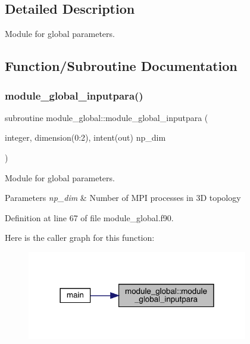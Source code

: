 \subsection{Detailed Description}
Module for global parameters. 

\subsection{Function/\+Subroutine Documentation}
\mbox{\label{namespacemodule__global_a74cb46a87131e7b91b464cd2a2c480d2}} 
\subsubsection{\texorpdfstring{module\_global\_inputpara()}{module\_global\_inputpara()}}
{\footnotesize\ttfamily subroutine module\+\_\+global\+::module\+\_\+global\+\_\+inputpara (\begin{DoxyParamCaption}\item[{integer, dimension(0\+:2), intent(out)}]{np\+\_\+dim }\end{DoxyParamCaption})}



Module for global parameters. 


\begin{DoxyParams}{Parameters}
{\em np\+\_\+dim} & Number of M\+PI processes in 3D topology \\
\hline
\end{DoxyParams}


Definition at line 67 of file module\+\_\+global.\+f90.

Here is the caller graph for this function\+:\nopagebreak
\begin{figure}[H]
\begin{center}
\leavevmode
\includegraphics[width=273pt]{namespacemodule__global_a74cb46a87131e7b91b464cd2a2c480d2_icgraph}
\end{center}
\end{figure}


